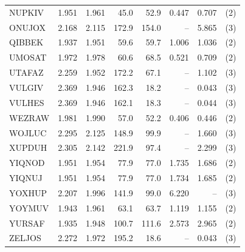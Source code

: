 \begin{table}[htbp]
\begin{tabular}{lrrrrrrc}
NUPKIV & 1.951 & 1.961 & 45.0 & 52.9 & 0.447 & 0.707 & (2) \\
ONUJOX & 2.168 & 2.115 & 172.9 & 154.0 & -- & 5.865 & (3) \\
QIBBEK & 1.937 & 1.951 & 59.6 & 59.7 & 1.006 & 1.036 & (2) \\
UMOSAT & 1.972 & 1.978 & 60.6 & 68.5 & 0.521 & 0.709 & (2) \\
UTAFAZ & 2.259 & 1.952 & 172.2 & 67.1 & -- & 1.102 & (3) \\
VULGIV & 2.369 & 1.946 & 162.3 & 18.2 & -- & 0.043 & (3) \\
VULHES & 2.369 & 1.946 & 162.1 & 18.3 & -- & 0.044 & (3) \\
WEZRAW & 1.981 & 1.990 & 57.0 & 52.2 & 0.406 & 0.446 & (2) \\
WOJLUC & 2.295 & 2.125 & 148.9 & 99.9 & -- & 1.660 & (3) \\
XUPDUH & 2.305 & 2.142 & 221.9 & 97.4 & -- & 2.299 & (3) \\
YIQNOD & 1.951 & 1.954 & 77.9 & 77.0 & 1.735 & 1.686 & (2) \\
YIQNUJ & 1.951 & 1.954 & 77.9 & 77.0 & 1.734 & 1.685 & (2) \\
YOXHUP & 2.207 & 1.996 & 141.9 & 99.0 & 6.220 & -- & (3) \\
YOYMUV & 1.943 & 1.961 & 63.1 & 63.7 & 1.119 & 1.155 & (2) \\
YURSAF & 1.935 & 1.948 & 100.7 & 111.6 & 2.573 & 2.965 & (2) \\
ZELJOS & 2.272 & 1.972 & 195.2 & 18.6 & -- & 0.043 & (3) \\
\hline
\end{tabular}
\end{table}
